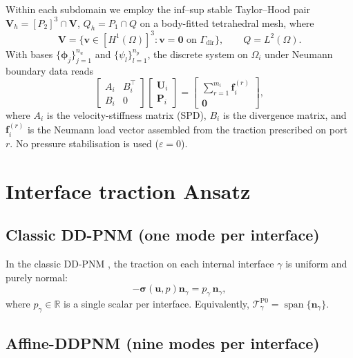 \documentclass[11pt,a4paper]{article}
\newcommand{\R}{\mathbb{R}}
\newcommand{\dom}{\Omega}
\newcommand{\pore}[1]{\Omega_{#1}}
\newcommand{\vel}{\bm{u}}
\newcommand{\pres}{p}
\newcommand{\stress}{\bm{\sigma}}
\newcommand{\normal}{\bm{n}}
\begin{document}
Within each subdomain we employ the inf--sup stable Taylor--Hood pair
$\mathbf{V}_h = [P_2]^3 \cap \mathbf{V}$,
$Q_h = P_1 \cap Q$ on a body-fitted tetrahedral mesh, where
\[
  \mathbf{V} = \{\bm{v} \in [H^1(\dom)]^3 : \bm{v} = \bm{0}
    \text{ on } \Gamma_{\text{dir}}\},\qquad
  Q = L^2(\dom).
\]
With bases $\{\bm{\phi}_j\}_{j=1}^{n_u}$ and $\{\psi_l\}_{l=1}^{n_p}$,
the discrete system on $\pore{i}$ under Neumann boundary data reads
\begin{equation}\label{eq:local-fe}
  \begin{bmatrix} A_i & B_i^\top \\ B_i & 0 \end{bmatrix}
  \begin{bmatrix} \mathbf{U}_i \\ \mathbf{P}_i \end{bmatrix}
  = \begin{bmatrix} \sum_{r=1}^{m_i} \bm{f}_i^{(r)} \\ \bm{0} \end{bmatrix},
\end{equation}
where $A_i$ is the velocity-stiffness matrix (SPD),
$B_i$ is the divergence matrix, and $\bm{f}_i^{(r)}$ is the Neumann load
vector assembled from the traction prescribed on port $r$.
No pressure stabilisation is used ($\varepsilon = 0$).

\section{Interface traction Ansatz}

\subsection{Classic DD-PNM (one mode per interface)}

In the classic DD-PNM \cite{sun2025ddpnm}, the traction on each internal
interface $\gamma$ is uniform and purely normal:
\begin{equation}\label{eq:classic-traction}
  -\stress(\vel,\pres)\normal_\gamma = p_\gamma\,\normal_\gamma,
\end{equation}
where $p_\gamma \in \R$ is a single scalar per interface.  Equivalently,
$\mathcal{T}_\gamma^{\text{P0}} = \operatorname{span}\{\normal_\gamma\}$.

\subsection{Affine-DDPNM (nine modes per interface)}
\label{sec:affine-ansatz}
\end{document}
